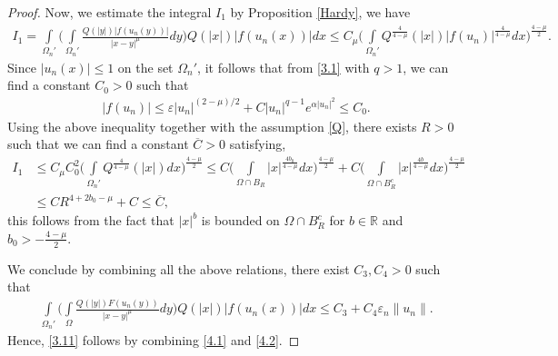 \documentclass[11pt]{amsart}
\numberwithin{equation}{section}
\newcommand{\R}{\mathbb{R}}
\newcommand{\1}{\frac{1}{2}}
\begin{document}
\begin{proof}
		Now, we estimate the integral $I_1$ by Proposition \ref{Hardy}, we have
		\begin{align}
			I_1  = \int\limits_{\Omega_n'} \Bigg( \int\limits_{\Omega_n'} \frac{Q(|y|)|f(u_n(y))|}{|x-y|^\mu}dy\Bigg) Q(|x|)\left| f(u_n(x))\right| dx  \leq C_\mu \Bigg( \int\limits_{\Omega_n'} Q^{\frac{4}{4-\mu}}(|x|) |f(u_n)|^{\frac{4}{4-\mu}}dx\Bigg)^{\frac{4-\mu}{2}}.\nonumber
		\end{align}
		Since $|u_n(x)| \leq 1$ on the set $\Omega_n'$, it follows that from \eqref{3.1} with $q>1$, we can find a constant $C_0>0$ such that
		\begin{align*}
			|f(u_n)| \leq \varepsilon |u_n|^{(2 - \mu)/2} + C|u_n|^{q-1}e^{\alpha |u_n|^2} \leq C_0. 
		\end{align*}
		Using the above inequality together with the assumption \eqref{Q}, there exists $R>0$ such that we can find a constant $\overline{C}>0$ satisfying,
		\begin{align}
			I_1 &\leq C_\mu C_0^2 \Bigg( \int\limits_{\Omega_n'} Q^{\frac{4}{4-\mu}}(|x|) dx\Bigg)^{\frac{4-\mu}{2}}\leq C \Bigg( \int\limits_{\Omega \cap B_R} |x|^{\frac{4b_0}{4-\mu}}dx \Bigg)^{\frac{4-\mu}{2}} + C\Bigg( \int\limits_{\Omega \cap B_R^c} |x|^{\frac{4b}{4-\mu}}dx\Bigg)^{\frac{4-\mu}{2}}\nonumber\\
			& \leq C R^{4+2b_0-\mu} +C \leq \overline{C}, \nonumber
		\end{align}
		this follows from the fact that $|x|^b$ is bounded on $\Omega \cap B_R^c$ for $b\in \R$ and $b_0 > -\frac{4-\mu}{2}$. 
		
		We conclude by combining all the above relations, there exist $C_3, C_4>0$ such that
		\begin{align}
			\label{4.2}
			\int\limits_{\Omega_n'} \Bigg( \int\limits_\Omega \frac{Q(|y|)F(u_n(y))}{|x-y|^\mu}dy\Bigg) Q(|x|)\left| f(u_n(x))\right| dx \leq C_3 + C_4 \varepsilon_n \|u_n\|.
		\end{align}
		Hence, \eqref{3.11} follows by combining \eqref{4.1} and \eqref{4.2}.
		

\end{proof}
\end{document}
